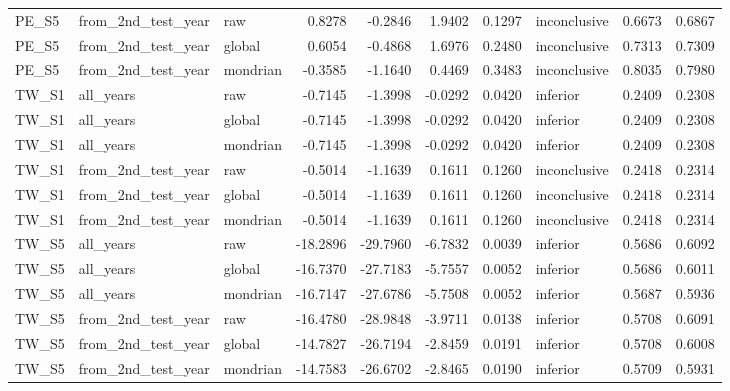 \begin{tabular}{lllrrrrlrr}
PE\_S5 & from\_2nd\_test\_year & raw & 0.8278 & -0.2846 & 1.9402 & 0.1297 & inconclusive & 0.6673 & 0.6867 \\
PE\_S5 & from\_2nd\_test\_year & global & 0.6054 & -0.4868 & 1.6976 & 0.2480 & inconclusive & 0.7313 & 0.7309 \\
PE\_S5 & from\_2nd\_test\_year & mondrian & -0.3585 & -1.1640 & 0.4469 & 0.3483 & inconclusive & 0.8035 & 0.7980 \\
TW\_S1 & all\_years & raw & -0.7145 & -1.3998 & -0.0292 & 0.0420 & inferior & 0.2409 & 0.2308 \\
TW\_S1 & all\_years & global & -0.7145 & -1.3998 & -0.0292 & 0.0420 & inferior & 0.2409 & 0.2308 \\
TW\_S1 & all\_years & mondrian & -0.7145 & -1.3998 & -0.0292 & 0.0420 & inferior & 0.2409 & 0.2308 \\
TW\_S1 & from\_2nd\_test\_year & raw & -0.5014 & -1.1639 & 0.1611 & 0.1260 & inconclusive & 0.2418 & 0.2314 \\
TW\_S1 & from\_2nd\_test\_year & global & -0.5014 & -1.1639 & 0.1611 & 0.1260 & inconclusive & 0.2418 & 0.2314 \\
TW\_S1 & from\_2nd\_test\_year & mondrian & -0.5014 & -1.1639 & 0.1611 & 0.1260 & inconclusive & 0.2418 & 0.2314 \\
TW\_S5 & all\_years & raw & -18.2896 & -29.7960 & -6.7832 & 0.0039 & inferior & 0.5686 & 0.6092 \\
TW\_S5 & all\_years & global & -16.7370 & -27.7183 & -5.7557 & 0.0052 & inferior & 0.5686 & 0.6011 \\
TW\_S5 & all\_years & mondrian & -16.7147 & -27.6786 & -5.7508 & 0.0052 & inferior & 0.5687 & 0.5936 \\
TW\_S5 & from\_2nd\_test\_year & raw & -16.4780 & -28.9848 & -3.9711 & 0.0138 & inferior & 0.5708 & 0.6091 \\
TW\_S5 & from\_2nd\_test\_year & global & -14.7827 & -26.7194 & -2.8459 & 0.0191 & inferior & 0.5708 & 0.6008 \\
TW\_S5 & from\_2nd\_test\_year & mondrian & -14.7583 & -26.6702 & -2.8465 & 0.0190 & inferior & 0.5709 & 0.5931 \\
\bottomrule
\end{tabular}
